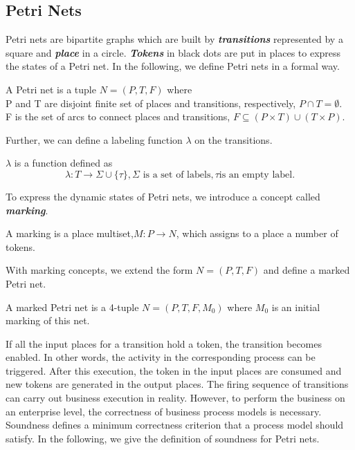 \subsection{Petri Nets}
Petri nets are bipartite graphs which are built by \textbf{\emph{transitions}} represented by a square and \textbf{\emph{place}} in a circle. \textbf{\emph{Tokens}} in black dots are put in places to express the states of a Petri net. In the following, we define Petri nets in a formal way.
\begin{definition}
	A Petri net is a tuple $N=(P,T,F)$ where \\ P and T are disjoint finite set of  places and transitions, respectively, $P \cap T = \emptyset $. \\ F is the set of arcs to connect places and transitions, $F \subseteq (P\times T)\cup (T \times P)$.
\end{definition}
Further, we can define a labeling function $\lambda$ on the transitions.
\begin{definition}	
	$\lambda$ is a function defined as 
	\[\lambda: T \rightarrow \Sigma \cup \{ \tau \}, \Sigma \text{ is a set of labels}, \tau \text{is an empty label}. \] 
\end{definition}
To express the dynamic states of Petri nets, we introduce a concept called \textbf{\emph{marking}}. 
\begin{definition}[Marking]
	A marking is a place multiset,$M:P \rightarrow N$, which assigns to a place a number of tokens. 
\end{definition}	
With marking concepts, we extend the form  $N=(P,T,F)$ and define a marked Petri net. 
\begin{definition}
A marked Petri net is a 4-tuple $N=(P,T,F,M_0)$ where $M_0$ is an initial marking of this net.
\end{definition}
If all the input places for a transition hold a token, the transition becomes enabled. In other words, the  activity in the corresponding process can be triggered. After this execution, the token in the input places are consumed and new tokens are generated in the output places. The firing sequence of transitions can carry out business execution in reality.  However, to perform the business on an enterprise level, the correctness of business process models is necessary. Soundness defines a minimum correctness criterion that a process model should satisfy\cite{van2006structural}. In the following, we give the definition of soundness for Petri nets.
